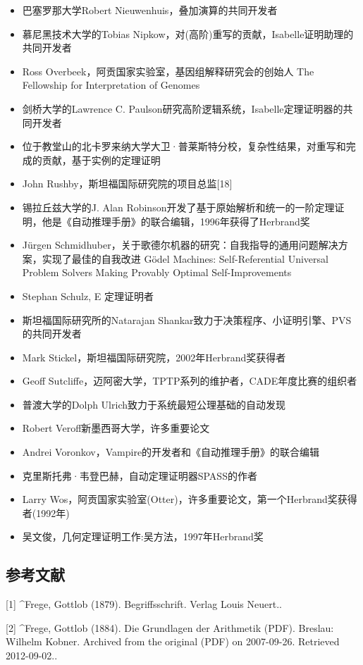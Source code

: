 \begin{itemize}
\item 巴塞罗那大学Robert Nieuwenhuis，叠加演算的共同开发者
\item 慕尼黑技术大学的Tobias Nipkow，对(高阶)重写的贡献，Isabelle证明助理的共同开发者
\item Ross Overbeek，阿贡国家实验室，基因组解释研究会的创始人 The Fellowship for Interpretation of Genomes
\item 剑桥大学的Lawrence C. Paulson研究高阶逻辑系统，Isabelle定理证明器的共同开发者
\item 位于教堂山的北卡罗来纳大学大卫·普莱斯特分校，复杂性结果，对重写和完成的贡献，基于实例的定理证明
\item John Rushby，斯坦福国际研究院的项目总监[18]
\item 锡拉丘兹大学的J. Alan Robinson开发了基于原始解析和统一的一阶定理证明，他是《自动推理手册》的联合编辑，1996年获得了Herbrand奖
\item Jürgen Schmidhuber，关于歌德尔机器的研究：自我指导的通用问题解决方案，实现了最佳的自我改进 Gödel Machines: Self-Referential Universal Problem Solvers Making Provably Optimal Self-Improvements
\item Stephan Schulz, E 定理证明者
\item 斯坦福国际研究所的Natarajan Shankar致力于决策程序、小证明引擎、PVS的共同开发者
\item Mark Stickel，斯坦福国际研究院，2002年Herbrand奖获得者
\item Geoff Sutcliffe，迈阿密大学，TPTP系列的维护者，CADE年度比赛的组织者
\item 普渡大学的Dolph Ulrich致力于系统最短公理基础的自动发现
\item Robert Veroff新墨西哥大学，许多重要论文
\item Andrei Voronkov，Vampire的开发者和《自动推理手册》的联合编辑
\item 克里斯托弗·韦登巴赫，自动定理证明器SPASS的作者
\item Larry Wos，阿贡国家实验室(Otter)，许多重要论文，第一个Herbrand奖获得者(1992年)
\item 吴文俊，几何定理证明工作:吴方法，1997年Herbrand奖
\end{itemize}

\subsection{参考文献}
[1]
^Frege, Gottlob (1879). Begriffsschrift. Verlag Louis Neuert..

[2]
^Frege, Gottlob (1884). Die Grundlagen der Arithmetik (PDF). Breslau: Wilhelm Kobner. Archived from the original (PDF) on 2007-09-26. Retrieved 2012-09-02..

